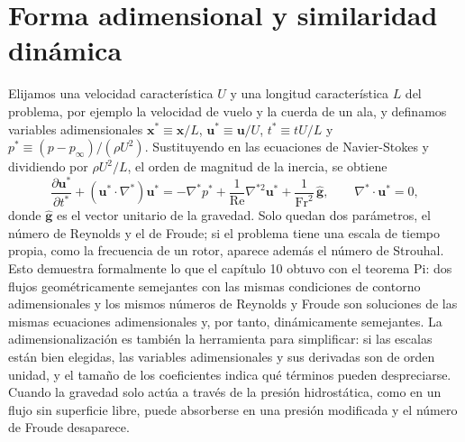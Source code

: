 \documentclass[10pt,openany]{book}
\begin{document}
\section{Forma adimensional y similaridad dinámica}

Elijamos una velocidad característica \(U\) y una longitud característica \(L\) del problema, por ejemplo la velocidad de vuelo y la cuerda de un ala, y definamos variables adimensionales \(\mathbf{x}^{*} \equiv \mathbf{x}/L\), \(\mathbf{u}^{*} \equiv \mathbf{u}/U\), \(t^{*} \equiv tU/L\) y \(p^{*} \equiv (p - p_\infty)/(\rho U^{2})\). Sustituyendo en las ecuaciones de Navier-Stokes y dividiendo por \(\rho U^{2}/L\), el orden de magnitud de la inercia, se obtiene
\begin{equation}
\frac{\partial\mathbf{u}^{*}}{\partial t^{*}} + (\mathbf{u}^{*}\cdot\nabla^{*})\mathbf{u}^{*} = -\nabla^{*}p^{*} + \frac{1}{\mathrm{Re}}\nabla^{*2}\mathbf{u}^{*} + \frac{1}{\mathrm{Fr}^{2}}\,\hat{\mathbf{g}}, \qquad \nabla^{*}\cdot\mathbf{u}^{*} = 0, \label{eq:c15-adimensional}
\end{equation}
donde \(\hat{\mathbf{g}}\) es el vector unitario de la gravedad. Solo quedan dos parámetros, el número de Reynolds y el de Froude; si el problema tiene una escala de tiempo propia, como la frecuencia de un rotor, aparece además el número de Strouhal. Esto demuestra formalmente lo que el capítulo 10 obtuvo con el teorema Pi: dos flujos geométricamente semejantes con las mismas condiciones de contorno adimensionales y los mismos números de Reynolds y Froude son soluciones de las mismas ecuaciones adimensionales y, por tanto, dinámicamente semejantes. La adimensionalización es también la herramienta para simplificar: si las escalas están bien elegidas, las variables adimensionales y sus derivadas son de orden unidad, y el tamaño de los coeficientes indica qué términos pueden despreciarse. Cuando la gravedad solo actúa a través de la presión hidrostática, como en un flujo sin superficie libre, puede absorberse en una presión modificada y el número de Froude desaparece.
\end{document}
